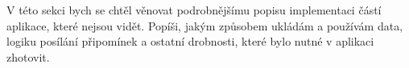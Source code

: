 \documentclass[../TakeYourPill.tex]{subfiles}
\begin{document}
V této sekci bych se chtěl věnovat podrobnějšímu popisu implementaci částí aplikace, které nejsou vidět. Popíši, jakým způsobem ukládám a používám data, logiku posílání připomínek a ostatní drobnosti, které bylo nutné v aplikaci zhotovit.
\end{document}
